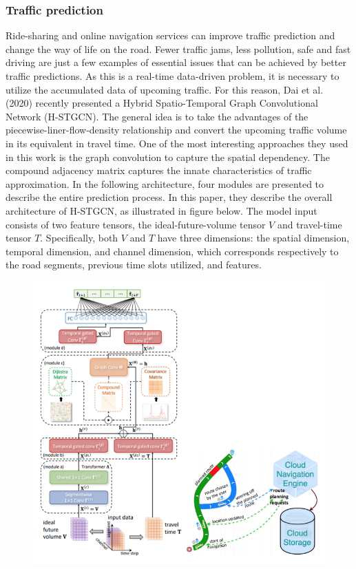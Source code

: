 \subsubsection{Traffic prediction}
Ride-sharing and online navigation services can improve traffic prediction and change the way of life on the road. Fewer traffic jams, less pollution, safe and fast driving are just a few examples of essential issues that can be achieved by better traffic predictions. As this is a real-time data-driven problem, it is necessary to utilize the accumulated data of upcoming traffic. For this reason, Dai et al. (2020) recently presented a Hybrid Spatio-Temporal Graph Convolutional Network (H-STGCN). The general idea is to take the advantages of the piecewise-liner-flow-density relationship and convert the upcoming traffic volume in its equivalent in travel time. One of the most interesting approaches they used in this work is the graph convolution to capture the spatial dependency. The compound adjacency matrix captures the innate characteristics of traffic approximation. In the following architecture, four modules are presented to describe the entire prediction process.
In this paper, they describe the overall architecture of H-STGCN, as illustrated in figure below. The model input consists of two feature tensors, the ideal-future-volume tensor $V$ and travel-time tensor $T$. Specifically, both $V$  and $T$ have three dimensions: the spatial dimension, temporal dimension, and channel dimension, which corresponds respectively to the road segments, previous time slots utilized, and features.

\begin{figure}[h]
    \includegraphics[width=\textwidth]{../Figures/ch_3_7_traffic.png}
\end{figure}

